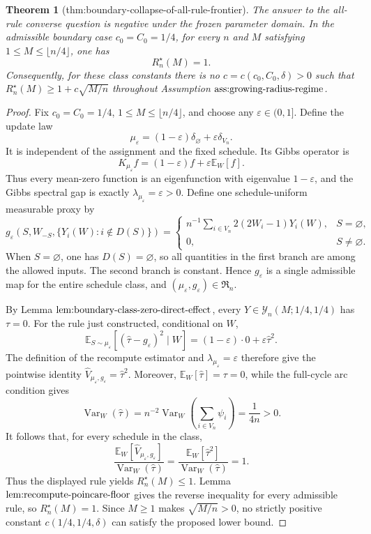 \documentclass{article}
\newtheorem{theorem}{Theorem}
\begin{document}
\begin{theorem}[thm:boundary-collapse-of-all-rule-frontier]\label{thm:boundary-collapse-of-all-rule-frontier}
The answer to the all-rule converse question is negative under the frozen parameter domain. In the admissible boundary case \(c_0=C_0=1/4\), for every \(n\) and \(M\) satisfying \(1\le M\le\lfloor n/4\rfloor\), one has \[R_n^\star(M)=1.\] Consequently, for these class constants there is no \(c=c(c_0,C_0,\delta)>0\) such that \(R_n^\star(M)\ge 1+c\sqrt{M/n}\) throughout Assumption \(\textnormal{ass:growing-radius-regime}\).
\end{theorem}
\begin{proof}
Fix \(c_0=C_0=1/4\), \(1\le M\le\lfloor n/4\rfloor\), and choose any \(\varepsilon\in(0,1]\). Define the update law\[\mu_\varepsilon=(1-\varepsilon)\delta_{\varnothing}+\varepsilon\delta_{V_n}.\]It is independent of the assignment and the fixed schedule. Its Gibbs operator is\[K_{\mu_\varepsilon}f=(1-\varepsilon)f+\varepsilon\mathbb E_W[f].\]Thus every mean-zero function is an eigenfunction with eigenvalue \(1-\varepsilon\), and the Gibbs spectral gap is exactly \(\lambda_{\mu_\varepsilon}=\varepsilon>0\). Define one schedule-uniform measurable proxy by\[g_\varepsilon(S,W_{-S},\{Y_i(W):i\notin D(S)\})=\begin{cases}n^{-1}\sum_{i\in V_n}2(2W_i-1)Y_i(W),&S=\varnothing,\\0,&S\ne\varnothing.\end{cases}\]When \(S=\varnothing\), one has \(D(S)=\varnothing\), so all quantities in the first branch are among the allowed inputs. The second branch is constant. Hence \(g_\varepsilon\) is a single admissible map for the entire schedule class, and \((\mu_\varepsilon,g_\varepsilon)\in\mathfrak R_n\).

By Lemma \(\textnormal{lem:boundary-class-zero-direct-effect}\), every \(Y\in\mathcal Y_n(M;1/4,1/4)\) has \(\tau=0\). For the rule just constructed, conditional on \(W\),\[\mathbb E_{S\sim\mu_\varepsilon}[(\widehat\tau-g_\varepsilon)^2\mid W]=(1-\varepsilon)\cdot0+\varepsilon\widehat\tau^2.\]The definition of the recompute estimator and \(\lambda_{\mu_\varepsilon}=\varepsilon\) therefore give the pointwise identity \(\widehat V_{\mu_\varepsilon,g_\varepsilon}=\widehat\tau^2\). Moreover, \(\mathbb E_W[\widehat\tau]=\tau=0\), while the full-cycle arc condition gives\[\operatorname{Var}_W(\widehat\tau)=n^{-2}\operatorname{Var}_W\!\left(\sum_{i\in V_n}\psi_i\right)=\frac{1}{4n}>0.\]It follows that, for every schedule in the class,\[\frac{\mathbb E_W[\widehat V_{\mu_\varepsilon,g_\varepsilon}]}{\operatorname{Var}_W(\widehat\tau)}=\frac{\mathbb E_W[\widehat\tau^2]}{\operatorname{Var}_W(\widehat\tau)}=1.\]Thus the displayed rule yields \(R_n^\star(M)\le1\). Lemma \(\textnormal{lem:recompute-poincare-floor}\) gives the reverse inequality for every admissible rule, so \(R_n^\star(M)=1\). Since \(M\ge1\) makes \(\sqrt{M/n}>0\), no strictly positive constant \(c(1/4,1/4,\delta)\) can satisfy the proposed lower bound.
\end{proof}
\end{document}
